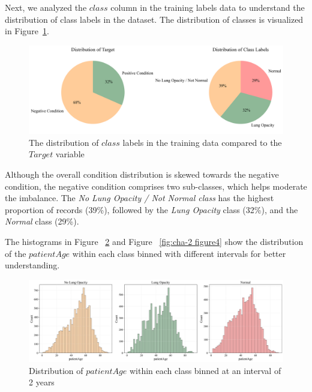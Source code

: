 Next, we analyzed the $class$ column in the training labels data to understand the distribution of class labels in the dataset. The distribution of classes is visualized in Figure~\ref{fig:cha-2 figure2}.


\begin{figure}[H]
    \begin{center}
        \includegraphics[width = 1.0\textwidth]{figures/Figure4.png}
        \caption{The distribution of $class$ labels in the training data compared to the $Target$ variable}
        \label{fig:cha-2 figure2}
    \end{center}
\end{figure}

Although the overall condition distribution is skewed towards the negative condition, the negative condition comprises two sub-classes, which helps moderate the imbalance. The \emph{No Lung Opacity / Not Normal class} has the highest proportion of records (39\%), followed by the \emph{Lung Opacity} class (32\%), and the \emph{Normal} class (29\%).

The histograms in Figure ~\ref{fig:cha-2 figure3} and Figure ~\ref{fig:cha-2 figure4} show the distribution of the $patientAge$ within each class binned with different intervals for better understanding.

\begin{figure}[H]
    \begin{center}
        \includegraphics[width = 1.0\textwidth]{figures/Figure5.png}
        \caption{Distribution of $patientAge$ within each class binned at an interval of 2 years}
        \label{fig:cha-2 figure3}
    \end{center}
\end{figure}

